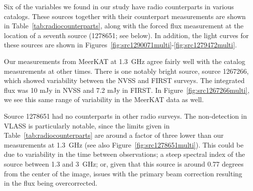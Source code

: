 \documentclass[12pt]{article}
\begin{document}
Six of the variables we found in our study have radio counterparts in various catalogs. These sources together with their counterpart measurements are shown in Table~\ref{tab:radiocounterparts}, along with the forced flux measurement at the location of a seventh source (1278651; see below). In addition, the light curves for these sources are shown in Figures~\ref{fig:src1290071multi}-\ref{fig:src1279472multi}. 

Our measurements from MeerKAT at 1.3~GHz agree fairly well with the catalog measurements at other times. There is one notably bright source, source 1267266, which showed variability between the NVSS and FIRST surveys. The integrated flux was 10 mJy in NVSS and 7.2 mJy in FIRST. In Figure~\ref{fig:src1267266multi}, we see this same range of variability in the MeerKAT data as well. 

Source 1278651 had no counterparts in other radio surveys. The non-detection in VLASS is particularly notable, since the limits given in Table~\ref{tab:radiocounterparts} are around a factor of three lower than our measurements at 1.3~GHz (see also Figure~\ref{fig:src1278651multi}). This could be due to variability in the time between observations; a steep spectral index of the source between 1.3 and 3~GHz; or, given that this source is around 0.77 degrees from the center of the image, issues with the primary beam correction resulting in the flux being overcorrected.
\end{document}
